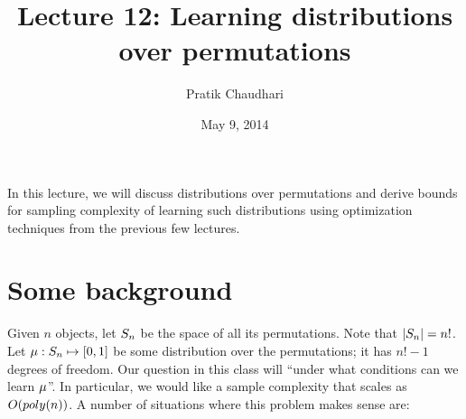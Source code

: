 \documentclass[letterpaper, 11pt, reqno]{amsart}
\title{Lecture 12: Learning distributions over permutations}
\date{May 9, 2014}
\author{Pratik Chaudhari}
\begin{document}
\maketitle

In this lecture, we will discuss distributions over permutations and derive bounds for sampling complexity of learning such distributions using optimization techniques from the previous few lectures.

\section{Some background}

Given $n$ objects, let $S_n$ be the space of all its permutations. Note that $\left| S_n \right| = n!$. Let $\mu : S_n \mapsto [0,1]$ be some distribution over the permutations; it has $n!-1$ degrees of freedom. Our question in this class will ``under what conditions can we learn $\mu$''. In particular, we would like a sample complexity that scales as $O(poly(n))$. A number of situations where this problem makes sense are:
\end{document}
